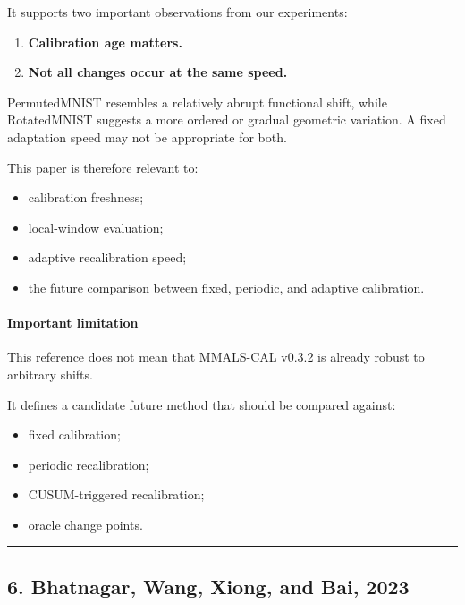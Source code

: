 It supports two important observations from our experiments:

\begin{enumerate}
\def\labelenumi{\arabic{enumi}.}
\tightlist
\item
  \textbf{Calibration age matters.}
\item
  \textbf{Not all changes occur at the same speed.}
\end{enumerate}

PermutedMNIST resembles a relatively abrupt functional shift, while RotatedMNIST suggests a more ordered or gradual geometric variation. A fixed adaptation speed may not be appropriate for both.

This paper is therefore relevant to:

\begin{itemize}
\tightlist
\item
  calibration freshness;
\item
  local-window evaluation;
\item
  adaptive recalibration speed;
\item
  the future comparison between fixed, periodic, and adaptive calibration.
\end{itemize}

\paragraph{Important limitation}\label{important-limitation-1}

This reference does not mean that MMALS-CAL v0.3.2 is already robust to arbitrary shifts.

It defines a candidate future method that should be compared against:

\begin{itemize}
\tightlist
\item
  fixed calibration;
\item
  periodic recalibration;
\item
  CUSUM-triggered recalibration;
\item
  oracle change points.
\end{itemize}

\begin{center}\rule{0.5\linewidth}{0.5pt}\end{center}

\subsection{6. Bhatnagar, Wang, Xiong, and Bai, 2023}\label{bhatnagar-wang-xiong-and-bai-2023}

